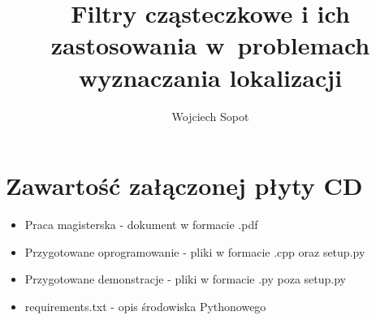 \documentclass{mgr}
\title{Filtry cząsteczkowe i ich zastosowania w~problemach wyznaczania lokalizacji}
\author{Wojciech Sopot}
\begin{document}

\maketitle %

\tableofcontents %
	











\appendix
\chapter{Zawartość załączonej płyty CD}
\begin{itemize}
    \item Praca magisterska - dokument w formacie .pdf
    \item Przygotowane oprogramowanie - pliki w formacie .cpp oraz setup.py
    \item Przygotowane demonstracje - pliki w formacie .py poza setup.py
    \item requirements.txt - opis środowiska Pythonowego
\end{itemize}

{} %

 \listoffigures
\end{document}
